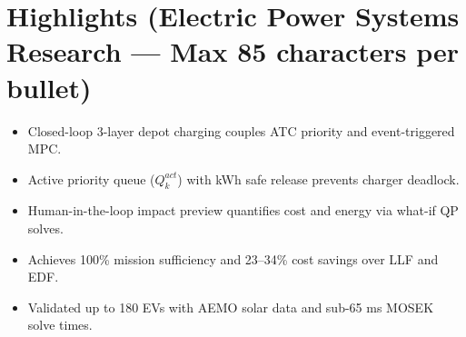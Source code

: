 \documentclass[11pt]{article}
\begin{document}
\section*{Highlights (Electric Power Systems Research --- Max 85 characters per bullet)}
\begin{itemize}
    \item Closed-loop 3-layer depot charging couples ATC priority and event-triggered MPC.
    \item Active priority queue ($Q_k^{act}$) with kWh safe release prevents charger deadlock.
    \item Human-in-the-loop impact preview quantifies cost and energy via what-if QP solves.
    \item Achieves 100\% mission sufficiency and 23--34\% cost savings over LLF and EDF.
    \item Validated up to 180 EVs with AEMO solar data and sub-65 ms MOSEK solve times.
\end{itemize}
\end{document}
